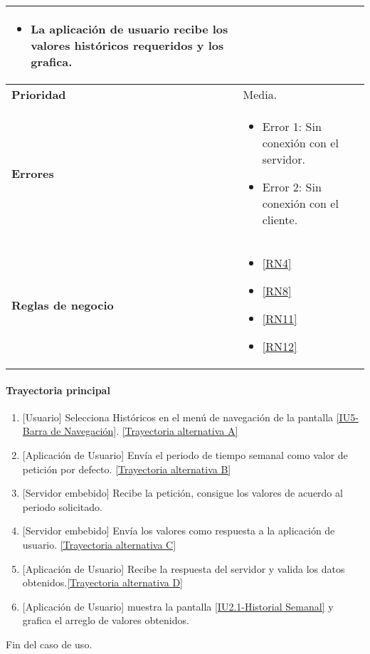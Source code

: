 \begin{longtable}{|J{5cm}|J{10.3cm}|}
\begin{itemize}
			\item La aplicación de usuario recibe los valores históricos requeridos y los grafica.
		\end{itemize} \\ \hline 
	\textbf{Prioridad} & 
		Media. \\ \hline
	\textbf{Errores} & 
		\begin{itemize}
		    \item \label{CUU1.3:Error1} Error 1: Sin conexión con el servidor.
		    \item \label{CUU1.3:Error2} Error 2: Sin conexión con el cliente.
		\end{itemize} \\ \hline
	\textbf{Reglas de negocio} & 
		\begin{itemize}
		    \item \ref{RN4}
		    \item \ref{RN8}
			\item \ref{RN11}
			\item \ref{RN12}
		\end{itemize} \\ \hline
\end{longtable}

\paragraph{Trayectoria principal}
    \label{SUB-U-CU1.3:TP}
	\begin{enumerate}
	    \item {[Usuario]} Selecciona Históricos en el menú de navegación de la pantalla \hyperref[fig:Barra de navegacion]{[IU5-Barra de Navegación]}. \hyperref[SUB-U-CU1.3:TA]{[Trayectoria alternativa A]} 
		\item {[Aplicación de Usuario]} Envía el periodo de tiempo semanal como valor de petición por defecto. \hyperref[SUB-U-CU1.3:TB]{[Trayectoria alternativa B]} 
		\item {[Servidor embebido]} Recibe la petición, consigue los valores de acuerdo al periodo solicitado. 
		\item {[Servidor embebido]} Envía los valores como respuesta a la aplicación de usuario. \hyperref[SUB-U-CU1.3:TC]{[Trayectoria alternativa C]}
        \item {[Aplicación de Usuario]} Recibe la respuesta del servidor y valida los datos obtenidos.\hyperref[SUB-U-CU1.3:TD]{[Trayectoria alternativa D]}
        \item {[Aplicación de Usuario]} muestra la pantalla \hyperref[fig:Historial Semanal]{[IU2.1-Historial Semanal]} y grafica el arreglo de valores obtenidos. 
	\end{enumerate}
	Fin del caso de uso.

